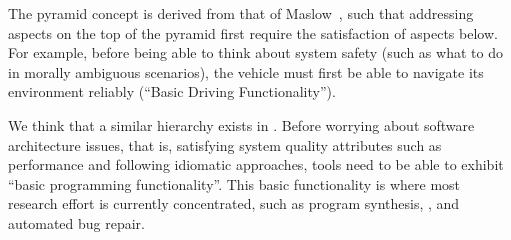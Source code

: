 The pyramid concept is derived from that of Maslow~\cite{Maslow1943}, such that addressing aspects on the top of the pyramid first require the satisfaction of aspects below. 
For example, before being able to think about system safety (such as what to do in morally ambiguous scenarios), the vehicle must first be able to navigate its environment reliably (``Basic Driving Functionality'').

We think that a similar hierarchy exists in \AISE{}. Before worrying about software architecture issues, that is, satisfying system quality attributes such as performance and following idiomatic approaches, \AISE{} tools need to be able to exhibit ``basic programming functionality''. This basic functionality is where most research effort is currently concentrated, such as program synthesis, \cct{}, and automated bug repair.









